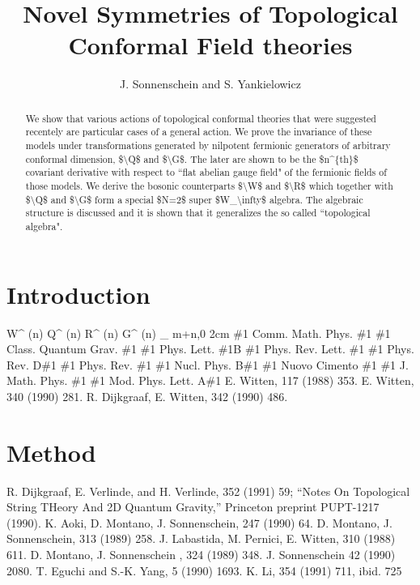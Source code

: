 \documentclass[11pt]{article}
\title{Novel Symmetries of Topological Conformal Field theories}
\author{J. Sonnenschein and S. Yankielowicz}
\date{}
\begin{document}
\maketitle
\begin{abstract}

We show that various actions of topological conformal theories that were suggested recentely are particular cases of a general action. We prove the invariance of these models under transformations generated by nilpotent fermionic generators of arbitrary conformal dimension, \$\textbackslash{}Q\$ and \$\textbackslash{}G\$. The later are shown to be the \$n\textasciicircum{}\{th\}\$ covariant derivative with respect to ``flat abelian gauge field" of the fermionic fields of those models. We derive the bosonic counterparts \$\textbackslash{}W\$ and \$\textbackslash{}R\$ which together with \$\textbackslash{}Q\$ and \$\textbackslash{}G\$ form a special \$N=2\$ super \$W\_\textbackslash{}infty\$ algebra. The algebraic structure is discussed and it is shown that it generalizes the so called ``topological algebra".

\end{abstract}

\section{Introduction}

W\textasciicircum{} (n) Q\textasciicircum{} (n) R\textasciicircum{} (n) G\textasciicircum{} (n) \_ m+n,0 2cm \#1 Comm. Math. Phys. \#1 \#1 Class. Quantum Grav. \#1 \#1 Phys. Lett. \#1B \#1 Phys. Rev. Lett. \#1 \#1 Phys. Rev. D\#1 \#1 Phys. Rev. \#1 \#1 Nucl. Phys. B\#1 \#1 Nuovo Cimento \#1 \#1 J. Math. Phys. \#1 \#1 Mod. Phys. Lett. A\#1 E. Witten, 117 (1988) 353. E. Witten, 340 (1990) 281. R. Dijkgraaf, E. Witten, 342 (1990) 486.

\section{Method}

R. Dijkgraaf, E. Verlinde, and H. Verlinde, 352 (1991) 59; ``Notes On Topological String THeory And 2D Quantum Gravity,'' Princeton preprint PUPT-1217 (1990). K. Aoki, D. Montano, J. Sonnenschein, 247 (1990) 64. D. Montano, J. Sonnenschein, 313 (1989) 258. J. Labastida, M. Pernici, E. Witten, 310 (1988) 611. D. Montano, J. Sonnenschein , 324 (1989) 348. J. Sonnenschein 42 (1990) 2080. T. Eguchi and S.-K. Yang, 5 (1990) 1693. K. Li, 354 (1991) 711, ibid. 725
\end{document}
